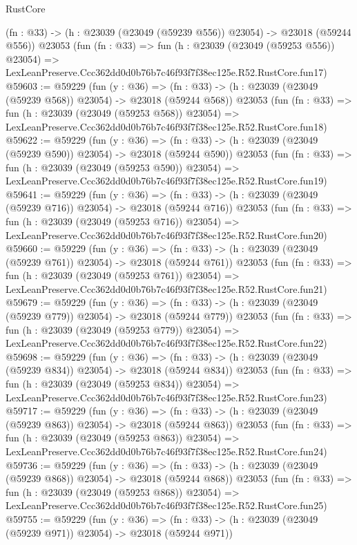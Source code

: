 \begin{lexlean}{RustCore}
\begin{coremodule}
    (fn : @33) -> (h : @23039 (@23049 (@59239 @556)) @23054) -> @23018 (@59244 @556))
    @23053
    (fun (fn : @33) =>
    fun (h : @23039 (@23049 (@59253 @556)) @23054) =>
    LexLeanPreserve.Ccc362dd0d0b76b7c46f93f7f38ec125e.R52.RustCore.fun17)
@59603 := @59229
    (fun (y : @36) =>
    (fn : @33) -> (h : @23039 (@23049 (@59239 @568)) @23054) -> @23018 (@59244 @568))
    @23053
    (fun (fn : @33) =>
    fun (h : @23039 (@23049 (@59253 @568)) @23054) =>
    LexLeanPreserve.Ccc362dd0d0b76b7c46f93f7f38ec125e.R52.RustCore.fun18)
@59622 := @59229
    (fun (y : @36) =>
    (fn : @33) -> (h : @23039 (@23049 (@59239 @590)) @23054) -> @23018 (@59244 @590))
    @23053
    (fun (fn : @33) =>
    fun (h : @23039 (@23049 (@59253 @590)) @23054) =>
    LexLeanPreserve.Ccc362dd0d0b76b7c46f93f7f38ec125e.R52.RustCore.fun19)
@59641 := @59229
    (fun (y : @36) =>
    (fn : @33) -> (h : @23039 (@23049 (@59239 @716)) @23054) -> @23018 (@59244 @716))
    @23053
    (fun (fn : @33) =>
    fun (h : @23039 (@23049 (@59253 @716)) @23054) =>
    LexLeanPreserve.Ccc362dd0d0b76b7c46f93f7f38ec125e.R52.RustCore.fun20)
@59660 := @59229
    (fun (y : @36) =>
    (fn : @33) -> (h : @23039 (@23049 (@59239 @761)) @23054) -> @23018 (@59244 @761))
    @23053
    (fun (fn : @33) =>
    fun (h : @23039 (@23049 (@59253 @761)) @23054) =>
    LexLeanPreserve.Ccc362dd0d0b76b7c46f93f7f38ec125e.R52.RustCore.fun21)
@59679 := @59229
    (fun (y : @36) =>
    (fn : @33) -> (h : @23039 (@23049 (@59239 @779)) @23054) -> @23018 (@59244 @779))
    @23053
    (fun (fn : @33) =>
    fun (h : @23039 (@23049 (@59253 @779)) @23054) =>
    LexLeanPreserve.Ccc362dd0d0b76b7c46f93f7f38ec125e.R52.RustCore.fun22)
@59698 := @59229
    (fun (y : @36) =>
    (fn : @33) -> (h : @23039 (@23049 (@59239 @834)) @23054) -> @23018 (@59244 @834))
    @23053
    (fun (fn : @33) =>
    fun (h : @23039 (@23049 (@59253 @834)) @23054) =>
    LexLeanPreserve.Ccc362dd0d0b76b7c46f93f7f38ec125e.R52.RustCore.fun23)
@59717 := @59229
    (fun (y : @36) =>
    (fn : @33) -> (h : @23039 (@23049 (@59239 @863)) @23054) -> @23018 (@59244 @863))
    @23053
    (fun (fn : @33) =>
    fun (h : @23039 (@23049 (@59253 @863)) @23054) =>
    LexLeanPreserve.Ccc362dd0d0b76b7c46f93f7f38ec125e.R52.RustCore.fun24)
@59736 := @59229
    (fun (y : @36) =>
    (fn : @33) -> (h : @23039 (@23049 (@59239 @868)) @23054) -> @23018 (@59244 @868))
    @23053
    (fun (fn : @33) =>
    fun (h : @23039 (@23049 (@59253 @868)) @23054) =>
    LexLeanPreserve.Ccc362dd0d0b76b7c46f93f7f38ec125e.R52.RustCore.fun25)
@59755 := @59229
    (fun (y : @36) =>
    (fn : @33) -> (h : @23039 (@23049 (@59239 @971)) @23054) -> @23018 (@59244 @971))

\end{coremodule}
\end{lexlean}
